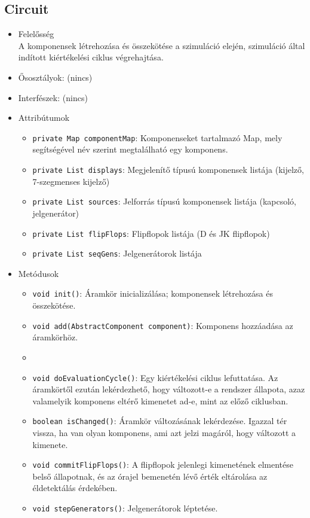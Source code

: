 \subsection{Circuit}
\begin{itemize}
\item Felelősség\\
A komponensek létrehozása és összekötése a szimuláció elején, szimuláció által indított kiértékelési ciklus végrehajtása.
\item Ősosztályok: (nincs)
\item Interfészek: (nincs)
\item Attribútumok $\ $
\begin{itemize}
	\item \texttt{private Map componentMap}: Komponenseket tartalmazó Map, mely segítségével név szerint megtalálható egy komponens.
	\item \texttt{private List displays}: Megjelenítő típusú komponensek listája (kijelző, 7-szegmenses kijelző)
	\item \texttt{private List sources}: Jelforrás típusú komponensek listája (kapcsoló, jelgenerátor)
	\item \texttt{private List flipFlops}: Flipflopok listája (D és JK flipflopok)
	\item \texttt{private List seqGens}: Jelgenerátorok listája
\end{itemize}
\item Metódusok$\ $
\begin{itemize}
	\item \texttt{void init()}: Áramkör inicializálása; komponensek létrehozása és összekötése.
	\item \texttt{void add(AbstractComponent component)}: Komponens hozzáadása az áramkörhöz.
	\item {}
	\item \texttt{void doEvaluationCycle()}: Egy kiértékelési ciklus lefuttatása. Az áramkörtől ezután lekérdezhető, hogy változott-e a rendszer állapota, azaz valamelyik komponens eltérő kimenetet ad-e, mint az előző ciklusban.
	\item \texttt{boolean isChanged()}: Áramkör változásának lekérdezése. Igazzal tér vissza, ha van olyan komponens, ami azt jelzi magáról, hogy változott a kimenete.
	\item \texttt{void commitFlipFlops()}: A flipflopok jelenlegi kimenetének elmentése belső állapotnak, és az órajel bemenetén lévő érték eltárolása az éldetektálás érdekében.
	\item \texttt{void stepGenerators()}: Jelgenerátorok léptetése.
\end{itemize}
\end{itemize}

